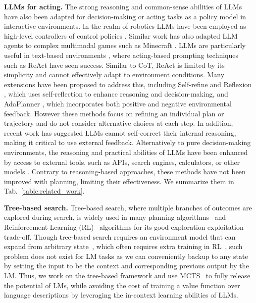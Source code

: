 \documentclass{article} \usepackage{iclr2024_conference,times}
\begin{document}
\textbf{LLMs for acting.} The strong reasoning and common-sense abilities of LLMs have also been adapted for decision-making or acting tasks as a policy model in interactive environments. In the realm of robotics LLMs have been employed as high-level controllers of control policies \citep{ahn2022do, huang2022inner, driess2023palme}. Similar work \citep{openai2022vpt, wang2023voyager, zhu2023ghost} has also adapted LLM agents to complex multimodal games such as Minecraft \citep{guss2019minerl, fan2022minedojo}. LLMs are particularly useful in text-based environments \citep{liu2018reinforcement,shridhar2020alfworld,liu2023agentbench}, where acting-based prompting techniques such as ReAct \citep{yao2023react} have seen success. Similar to CoT, ReAct is limited by its simplicity and cannot effectively adapt to environment conditions. Many extensions have been proposed to address this, including Self-refine \citep{madaan2023selfrefine} and Reflexion \citep{shinn2023reflexion, yao2023retroformer}, which uses self-reflection to enhance reasoning and decision-making, and AdaPlanner \citep{sun2023adaplanner}, which incorporates both positive and negative environmental feedback. However these methods focus on refining an individual plan or trajectory and do not consider alternative choices at each step. In addition, recent work \citep{huang2023large} has suggested LLMs cannot self-correct their internal reasoning, making it critical to use external feedback. Alternatively to pure decision-making environments, the reasoning and practical abilities of LLMs have been enhanced by access to external tools, such as APIs, search engines, calculators, or other models \citep{schick2023toolformer, shen2023hugginggpt, surís2023vipergpt}. Contrary to reasoning-based approaches, these methods have not been improved with planning, limiting their effectiveness. We summarize them in Tab.~\ref{table:related_work}.

\textbf{Tree-based search.} Tree-based search, where multiple branches of outcomes are explored during search, is widely used in many planning algorithms~\citep{swiechowski2023monte, lavalle2001rapidly} and Reinforcement Learning (RL)~\citep{hafner2019learning, du2023learning, wu2023daydreamer} algorithms for its good exploration-exploitation trade-off. Though tree-based search requires an environment model that can expand from arbitrary state~\citep{vodopivec2017monte}, which often requires extra training in RL~\citep{hafner2023mastering}, such problem does not exist for LM tasks as we can conveniently backup to any state by setting the input to be the context and corresponding previous output by the LM. Thus, we work on the tree-based framework and use MCTS~\citep{swiechowski2023monte} to fully release the potential of LMs, while avoiding the cost of training a value function over language descriptions by leveraging the in-context learning \citep{GPT3} abilities of LLMs.
\end{document}
